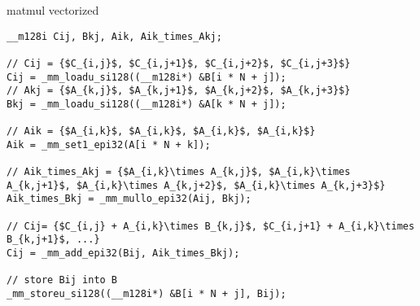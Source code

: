 \begin{frame}[fragile,label=sqVectCode]{matmul vectorized}
\begin{lstlisting}
__m128i Cij, Bkj, Aik, Aik_times_Akj;

// Cij = {$C_{i,j}$, $C_{i,j+1}$, $C_{i,j+2}$, $C_{i,j+3}$}
Cij = _mm_loadu_si128((__m128i*) &B[i * N + j]);
// Akj = {$A_{k,j}$, $A_{k,j+1}$, $A_{k,j+2}$, $A_{k,j+3}$}
Bkj = _mm_loadu_si128((__m128i*) &A[k * N + j]);

// Aik = {$A_{i,k}$, $A_{i,k}$, $A_{i,k}$, $A_{i,k}$}
Aik = _mm_set1_epi32(A[i * N + k]);

// Aik_times_Akj = {$A_{i,k}\times A_{k,j}$, $A_{i,k}\times A_{k,j+1}$, $A_{i,k}\times A_{k,j+2}$, $A_{i,k}\times A_{k,j+3}$}
Aik_times_Bkj = _mm_mullo_epi32(Aij, Bkj);

// Cij= {$C_{i,j} + A_{i,k}\times B_{k,j}$, $C_{i,j+1} + A_{i,k}\times B_{k,j+1}$, ...}
Cij = _mm_add_epi32(Bij, Aik_times_Bkj);

// store Bij into B
_mm_storeu_si128((__m128i*) &B[i * N + j], Bij);
\end{lstlisting}
\end{frame}

